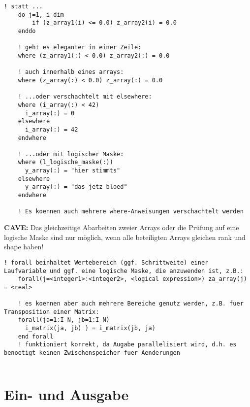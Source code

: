 \documentclass[a4paper, twocolumn]{scrarticle}
\begin{document}
\begin{lstlisting}[caption={\bfseries where-Statement als Ersatz für do-if in Feldern},language=Fortran95Konkret]
	! statt ...
	do j=1, i_dim
		if (z_array1(i) <= 0.0) z_array2(i) = 0.0
	enddo
	
	! geht es eleganter in einer Zeile:
	where (z_array1(:) < 0.0) z_array2(:) = 0.0
	
	! auch innerhalb eines arrays:
	where (z_array(:) < 0.0) z_array(:) = 0.0
	
	! ...oder verschachtelt mit elsewhere:
	where (i_array(:) < 42)
	  i_array(:) = 0
	elsewhere
	  i_array(:) = 42
	endwhere
	
	! ...oder mit logischer Maske:
	where (l_logische_maske(:))
	  y_array(:) = "hier stimmts"
	elsewhere
	  y_array(:) = "das jetz bloed"
	endwhere
	
	! Es koennen auch mehrere where-Anweisungen verschachtelt werden
\end{lstlisting}
\textbf{CAVE:} Das gleichzeitige Abarbeiten zweier Arrays oder die Prüfung auf eine logische Maske sind nur möglich, wenn alle beteiligten Arrays gleichen rank und shape haben!
\begin{lstlisting}[caption={forall-Statement als Parallelisierung von where}]
	! forall beinhaltet Wertebereich (ggf. Schrittweite) einer Laufvariable und ggf. eine logische Maske, die anzuwenden ist, z.B.:
	forall(j=<integer1>:<integer2>, <logical expression>) za_array(j) = <real>
	
	! es koennen aber auch mehrere Bereiche genutz werden, z.B. fuer Transposition einer Matrix:
	forall(ja=1:I_N, jb=1:I_N)
	  i_matrix(ja, jb) ) = i_matrix(jb, ja)
	end forall
	! funktioniert korrekt, da Augabe parallelisiert wird, d.h. es benoetigt keinen Zwischenspeicher fuer Aenderungen
	
\end{lstlisting}

\section{Ein- und Ausgabe}
\end{document}
